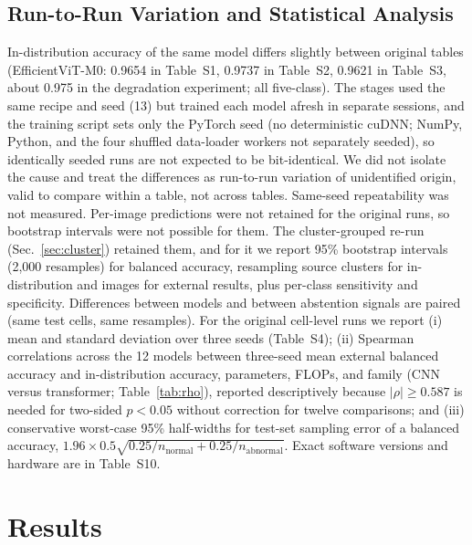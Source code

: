 \documentclass[12pt,letterpaper]{article}
\begin{document}
\subsection{Run-to-Run Variation and Statistical Analysis}
\label{sec:runvar}
\label{sec:stats}
In-distribution accuracy of the same model differs slightly between original tables (EfficientViT-M0: 0.9654 in Table~S1, 0.9737 in Table~S2, 0.9621 in Table~S3, about 0.975 in the degradation experiment; all five-class). The stages used the same recipe and seed (13) but trained each model afresh in separate sessions, and the training script sets only the PyTorch seed (no deterministic cuDNN; NumPy, Python, and the four shuffled data-loader workers not separately seeded), so identically seeded runs are not expected to be bit-identical. We did not isolate the cause and treat the differences as run-to-run variation of unidentified origin, valid to compare within a table, not across tables. Same-seed repeatability was not measured. Per-image predictions were not retained for the original runs, so bootstrap intervals were not possible for them. The cluster-grouped re-run (Sec.~\ref{sec:cluster}) retained them, and for it we report 95\% bootstrap intervals (2,000 resamples) for balanced accuracy, resampling source clusters for in-distribution and images for external results, plus per-class sensitivity and specificity. Differences between models and between abstention signals are paired (same test cells, same resamples). For the original cell-level runs we report (i) mean and standard deviation over three seeds (Table~S4); (ii) Spearman correlations across the 12 models between three-seed mean external balanced accuracy and in-distribution accuracy, parameters, FLOPs, and family (CNN versus transformer; Table~\ref{tab:rho}), reported descriptively because $|\rho|\geq 0.587$ is needed for two-sided $p<0.05$ without correction for twelve comparisons; and (iii) conservative worst-case 95\% half-widths for test-set sampling error of a balanced accuracy, $1.96\times 0.5\sqrt{0.25/n_{\text{normal}}+0.25/n_{\text{abnormal}}}$. Exact software versions and hardware are in Table~S10.

\section{Results}
\label{sec:results}
\end{document}

